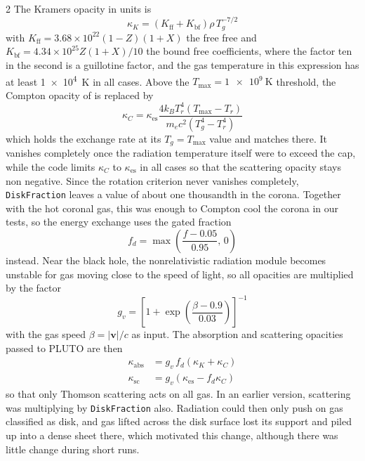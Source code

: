 \begin{multicols}{2}
	The Kramers opacity in \unit{\cgs} units is
	\begin{equation}
		\kappa_K = \left(K_\mathrm{ff} + K_\mathrm{bf}\right) \rho \, T_g^{-7/2}
	\end{equation}
	with $K_\mathrm{ff} = 3.68 \times 10^{22} \left(1 - Z\right) \left(1 + X\right)$ the free free and
	$K_\mathrm{bf} = 4.34 \times 10^{25} Z \left(1 + X\right) \!/ 10$ the bound free coefficients, where the factor ten in the second is a
	guillotine factor, and the gas temperature in this expression has at least \qty{1e4}{\kelvin} in all cases. Above the
	$T_\mathrm{max} = \qty{1e9}{\kelvin}$ threshold, the Compton opacity of  is replaced by
	\begin{equation}
		\kappa_C = \kappa_\mathrm{es} \frac{4 k_B T_r^4 \left(T_\mathrm{max} - T_r\right)}{m_e c^2 \left(T_g^4 - T_r^4\right)}
	\end{equation}
	which holds the exchange rate at its $T_g = T_\mathrm{max}$ value and matches  there. It vanishes completely once the
	radiation temperature itself were to exceed the cap, while the code limits $\kappa_C$ to $\kappa_\mathrm{es}$ in all cases so that the
	scattering opacity stays non negative. Since the rotation criterion never vanishes completely, \texttt{DiskFraction} leaves a value of
	about one thousandth in the corona. Together with the hot coronal gas, this was enough to Compton cool the corona in our tests,
	so the energy exchange uses the gated fraction
	\begin{equation}
		f_d = \max\left(\frac{f - 0.05}{0.95}, \, 0\right)
	\end{equation}
	instead. Near the black hole, the nonrelativistic radiation module becomes unstable for gas moving close to the speed of light,
	so all opacities are multiplied by the factor
	\begin{equation}
		g_v = \left[1 + \exp\left(\frac{\beta - 0.9}{0.03}\right)\right]^{-1}
	\end{equation}
	with the gas speed $\beta = \lvert \mathbf{v} \rvert / c$ as input. The absorption and scattering opacities passed to PLUTO
	are then
	\begin{align}
		\kappa_\mathrm{abs} &= g_v \,f_d \left(\kappa_K + \kappa_C\right) \\
		\kappa_\mathrm{sc} &= g_v \left(\kappa_\mathrm{es} - f_d \kappa_C\right)
	\end{align}
	so that only Thomson scattering acts on all gas. In an earlier version, scattering was multiplying by \texttt{DiskFraction} also.
	Radiation could then only push on gas classified as disk, and gas lifted across the disk surface lost its support and piled up into
	a dense sheet there, which motivated this change, although there was little change during short runs.


\end{multicols}
